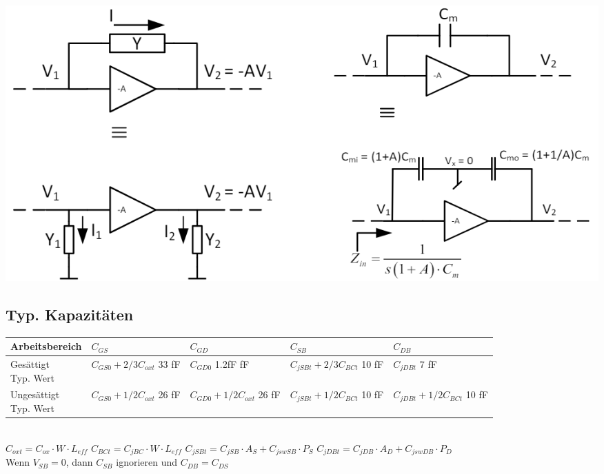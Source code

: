 \begin{minipage}{0.5\linewidth}
\includegraphics[width=0.9\linewidth]{Miller Approximation.png}
\end{minipage}
\subsection{Typ. Kapazitäten}
\begin{tabular}{|l|l|l|l|l|}
\hline
Arbeitsbereich & $C_{GS}$  & $C_{GD}$  & $C_{SB}$  & $C_{DB}$\\
\hline
\makecell[l]{Gesättigt\\ Typ. Wert} & \makecell[l]{$C_{GS0}+ 2/3C_{oxt}$\\ 33 fF} & \makecell[l]{$C_{GD0}$\\ 1.2fF fF} & \makecell[l]{$C_{jSBt}+ 2/3C_{BCt}$\\ 10 fF} & \makecell[l]{$C_{jDBt}$\\ 7 fF}\\
\hline
\makecell[l]{Ungesättigt\\ Typ. Wert} & \makecell[l]{$C_{GS0}+ 1/2C_{oxt}$\\ 26 fF} & \makecell[l]{$C_{GD0}+ 1/2C_{oxt}$\\ 26 fF} & \makecell[l]{$C_{jSBt}+ 1/2C_{BCt}$\\ 10 fF} & \makecell[l]{$C_{jDBt}+ 1/2C_{BCt}$\\ 10 fF}\\
\hline
\end{tabular}\\
$C_{oxt} = C_{ox}\cdot W \cdot L_{eff}$\hspace{20pt} $C_{BCt} = C_{jBC}\cdot W \cdot L_{eff}$\hspace{20pt} $C_{jSBt} = C_{jSB}\cdot A_S +C_{jswSB}\cdot P_S$ \hspace{20pt} $C_{jDBt} = C_{jDB}\cdot A_D + C_{jswDB} \cdot P_D$\\
Wenn $V_{SB} = 0$, dann $C_{SB}$ ignorieren und $C_{DB} = C_{DS}$
